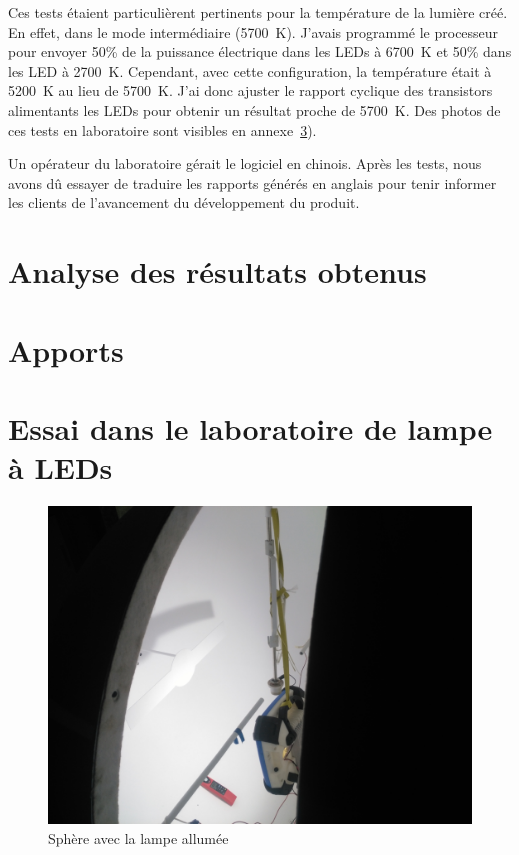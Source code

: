 \documentclass[a4paper, 11pt]{report}
\begin{document}
Ces tests étaient particulièrent pertinents pour la température de la lumière créé. En effet, dans le mode intermédiaire (\SI{5700}{\kelvin}). J'avais programmé le processeur pour envoyer 50\% de la puissance électrique dans les LEDs à \SI{6700}{\kelvin} et 50\% dans les LED à \SI{2700}{\kelvin}. Cependant, avec cette configuration, la température était à \SI{5200}{\kelvin} au lieu de \SI{5700}{\kelvin}. J'ai donc ajuster le rapport cyclique des transistors alimentants les LEDs pour obtenir un résultat proche de \SI{5700}{\kelvin}. Des photos de ces tests en laboratoire sont visibles en annexe~\ref{cha:labo_pictures}).

Un opérateur du laboratoire gérait le logiciel en chinois. Après les tests, nous avons dû essayer de traduire les rapports générés en anglais pour tenir informer les clients de l'avancement du développement du produit.  


\chapter{Analyse des résultats obtenus}

\chapter{Apports}



\appendix

\chapter{Essai dans le laboratoire de lampe à LEDs}
\label{cha:labo_pictures}

\begin{figure}[!h]
\begin{center}
\includegraphics[scale=0.1]{figures/photos/tests_worklamp/sphere/sphere_allumee.jpg}
\end{center}
\caption{Sphère avec la lampe allumée} 
\label{fig:lamp_on}
\end{figure}

\listoffigures



\end{document}
